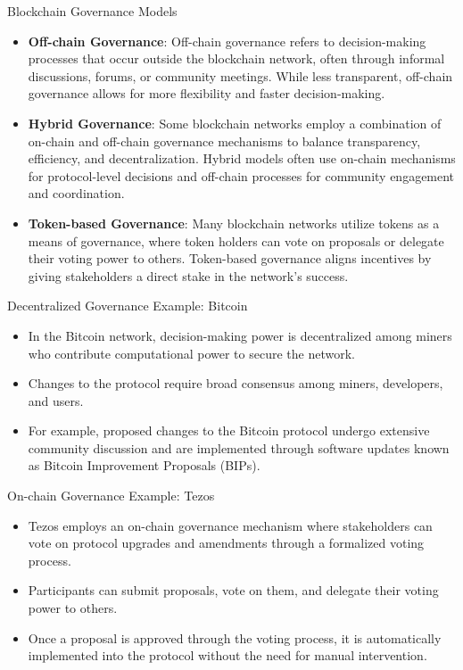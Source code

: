 \begin{withoutheadline}
\begin{frame}{Blockchain Governance Models}
\begin{itemize}
        \item \textbf{Off-chain Governance}: Off-chain governance refers to decision-making processes that occur outside the blockchain network, often through informal discussions, forums, or community meetings. While less transparent, off-chain governance allows for more flexibility and faster decision-making.

        \item \textbf{Hybrid Governance}: Some blockchain networks employ a combination of on-chain and off-chain governance mechanisms to balance transparency, efficiency, and decentralization. Hybrid models often use on-chain mechanisms for protocol-level decisions and off-chain processes for community engagement and coordination.

        \item \textbf{Token-based Governance}: Many blockchain networks utilize tokens as a means of governance, where token holders can vote on proposals or delegate their voting power to others. Token-based governance aligns incentives by giving stakeholders a direct stake in the network's success.
    \end{itemize}
\end{frame}

\begin{frame}{Decentralized Governance Example: Bitcoin}
    \begin{itemize}
        \item In the Bitcoin network, decision-making power is decentralized among miners who contribute computational power to secure the network.
        \item Changes to the protocol require broad consensus among miners, developers, and users.
        \item For example, proposed changes to the Bitcoin protocol undergo extensive community discussion and are implemented through software updates known as Bitcoin Improvement Proposals (BIPs).
    \end{itemize}
\end{frame}

\begin{frame}{On-chain Governance Example: Tezos}
    \begin{itemize}
        \item Tezos employs an on-chain governance mechanism where stakeholders can vote on protocol upgrades and amendments through a formalized voting process.
        \item Participants can submit proposals, vote on them, and delegate their voting power to others.
        \item Once a proposal is approved through the voting process, it is automatically implemented into the protocol without the need for manual intervention.
    \end{itemize}
\end{frame}


\end{withoutheadline}
